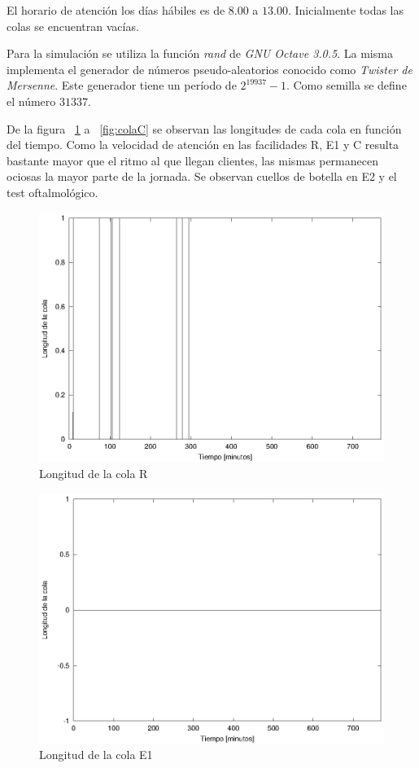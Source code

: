 \documentclass[a4paper,10pt]{article}
\begin{document}
El horario de atenci\'on los d\'ias h\'abiles es de $8.00$ a $13.00$. 
Inicialmente todas las colas se encuentran vac\'ias.
 

Para la simulaci\'on se utiliza la funci\'on \textit{rand} de 
\textit{GNU Octave 3.0.5}. La misma implementa el generador de n\'umeros
pseudo-aleatorios conocido como \textit{Twister de Mersenne}. Este generador
tiene un per\'iodo de $2^{19937} - 1$. Como semilla se define el n\'umero
$31337$.


De la figura  ~\ref{fig:colaR} a  ~\ref{fig:colaC} se observan las longitudes
de cada cola en funci\'on del tiempo. Como la velocidad de atenci\'on en las
facilidades R, E1 y C resulta bastante mayor que el ritmo al que llegan
clientes, las mismas permanecen ociosas la mayor parte de la jornada.
Se observan cuellos de botella en E2 y el test oftalmol\'ogico.

\begin{figure}[hp]
\centering
\includegraphics{graficos/plot_longitud_R.eps}
\caption{Longitud de la cola R}
\label{fig:colaR}
\end{figure}

\begin{figure}[hp]
\centering
\includegraphics{graficos/plot_longitud_E1.eps}
\caption{Longitud de la cola E1}
\label{fig:colaE1}
\end{figure}
\end{document}
